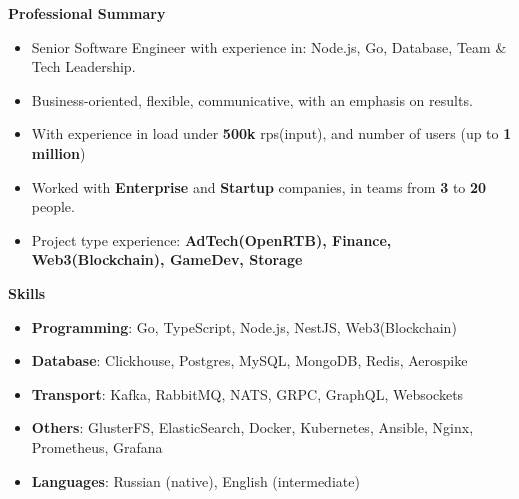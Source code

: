\documentclass{resume}
\begin{document}

\begin{rSection}{\textbf{Professional Summary}}
{
    \begin{itemize}
    \setlength\itemsep{-0.2em}
        \item Senior Software Engineer with experience in: Node.js, Go, Database, Team \& Tech Leadership.
        \item Business-oriented, flexible, communicative, with an emphasis on results.
        \item With experience in load under \textbf{500k} rps(input), and  number of users (up to \textbf{1 million})
        \item Worked with \textbf{Enterprise} and \textbf{Startup} companies, in teams from \textbf{3} to \textbf{20} people.
        \item Project type experience: \textbf{AdTech(OpenRTB), Finance, Web3(Blockchain), GameDev, Storage}
    \end{itemize}
}

\end{rSection}
\begin{rSection}{\textbf{Skills}}
    \begin{itemize}
    \setlength\itemsep{-0.2em}
        \item \textbf{Programming}: Go, TypeScript, Node.js, NestJS, Web3(Blockchain)
        \item \textbf{Database}: Clickhouse, Postgres, MySQL, MongoDB, Redis, Aerospike
        \item \textbf{Transport}: Kafka, RabbitMQ, NATS, GRPC, GraphQL, Websockets
        \item \textbf{Others}: GlusterFS, ElasticSearch, Docker, Kubernetes, Ansible, Nginx, Prometheus, Grafana
        \item \textbf{Languages}: Russian (native), English (intermediate)
    \end{itemize}
\end{rSection}
\end{document}
